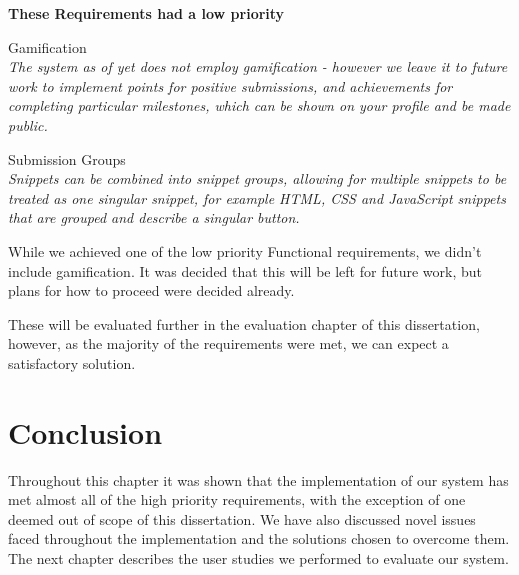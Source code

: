 \textbf{These Requirements had a low priority}

\begin{requirementsrevisit}[resume]

    \item Gamification \label{gamification} \\
	\textit{The system as of yet does not employ gamification - however we leave it to future work to implement points for positive submissions, and achievements for completing particular milestones, which can be shown on your profile and be made public.}

    \item Submission Groups \label{submissiongroups} \\
	\textit{Snippets can be combined into snippet groups, allowing for multiple snippets to be treated as one singular snippet, for example HTML, CSS and JavaScript snippets that are grouped and describe a singular button.}

While we achieved one of the low priority Functional requirements, we didn't include gamification. It was decided that this will be left for future work, but plans for how to proceed were decided already.

\end{requirementsrevisit}


These will be evaluated further in the evaluation chapter of this dissertation, however, as the majority of the requirements were met, we can expect a satisfactory solution.

\section{Conclusion}
Throughout this chapter it was shown that the implementation of our system has met almost all of the high priority requirements, with the exception of one deemed out of scope of this dissertation. 
We have also discussed novel issues faced throughout the implementation and the solutions chosen to overcome them.
The next chapter describes the user studies we performed to evaluate our system.

